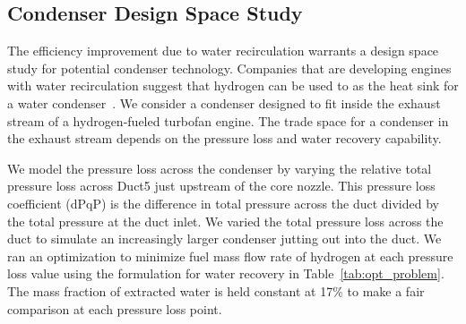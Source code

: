 \documentclass[conf]{new-aiaa}
\begin{document}
\subsection{Condenser Design Space Study}
\label{sub:dpqp_sweep}
The efficiency improvement due to water recirculation warrants a design space study for potential condenser technology.
Companies that are developing engines with water recirculation suggest that hydrogen can be used to as the heat sink for a water condenser~\cite{arpa-e_2021}.
We consider a condenser designed to fit inside the exhaust stream of a hydrogen-fueled turbofan engine.
The trade space for a condenser in the exhaust stream depends on the pressure loss and water recovery capability.

We model the pressure loss across the condenser by varying the relative total pressure loss across Duct5 just upstream of the core nozzle.
This pressure loss coefficient (dPqP) is the difference in total pressure across the duct divided by the total pressure at the duct inlet.
We varied the total pressure loss across the duct to simulate an increasingly larger condenser jutting out into the duct.
We ran an optimization to minimize fuel mass flow rate of hydrogen at each pressure loss value using the formulation for water recovery in Table~\ref{tab:opt_problem}.
The mass fraction of extracted water is held constant at 17\% to make a fair comparison at each pressure loss point.
\end{document}
